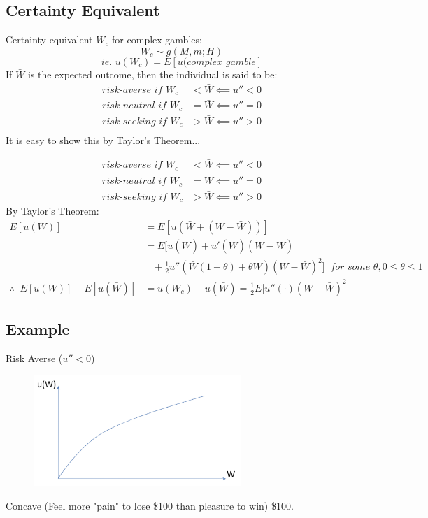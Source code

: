 \documentclass[
14pt,notheorems,hyperref={pdfauthor=whatever}
]{beamer}
\begin{document}
\subsection{Certainty Equivalent}

\begin{frame}
Certainty equivalent $W_c$ for complex gambles:
\[W_c \sim g(M,m;H)\]
\[\textit{ie. } u(W_c) = E[u(\textit{complex gamble}]\]
\hfill \break
If $\bar{W}$ is the expected outcome, then the individual is said to be:
\begin{align*}
    \textit{risk-averse if } W_c &< \bar{W} \impliedby u''<0\\
    \textit{risk-neutral if } W_c &= \bar{W} \impliedby u''=0\\
    \textit{risk-seeking if } W_c &> \bar{W} \impliedby u''>0\\
\end{align*}
It is easy to show this by Taylor's Theorem...
\end{frame}

\begin{frame}
\begin{align*}
    \textit{risk-averse if } W_c &< \bar{W} \impliedby u''<0\\
    \textit{risk-neutral if } W_c &= \bar{W} \impliedby u''=0\\
    \textit{risk-seeking if } W_c &> \bar{W} \impliedby u''>0
\end{align*}
By Taylor's Theorem:
\begin{align*}
    E[u(W)] &= E[u(\bar{W}+(W-\bar{W}))]\\
    &= E\bigg[u(\bar{W})+u'(\bar{W})(W-\bar{W})\\
    &\;\;\;+\frac{1}{2}u''(\bar{W}(1-\theta)+\theta W)(W-\bar{W})^2\bigg]\;\;\textit{for some }\theta, 0 \leq \theta \leq 1\\
    \therefore \;\; E[u(W)]-E[u(\bar{W})] &= u(W_c)-u(\bar{W}) = \frac{1}{2}E[u''(\cdot)(W-\bar{W})^2
\end{align*}
\end{frame}

\subsection{Example}
\begin{frame}
Risk Averse ($u''<0$)\\
\begin{figure}[l2-ra]
    \includegraphics[width=0.7\textwidth]{L2-riskaverse}
    \centering
\end{figure}
Concave (Feel more "pain" to lose \$100 than pleasure to win) \$100.
\end{frame}
\end{document}
